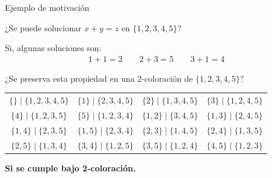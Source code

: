 \begin{frame}{Ejemplo de motivación}
    \begin{center}
        ¿Se puede solucionar $x+y=z$ en $\{1,2,3,4,5\}$?
        \pause\vspace{4pt}

        Si, algunas soluciones son:
        \begin{align*}
        1+1 = 2 \qquad
        2+3 = 5 \qquad
        3+1 = 4
        \end{align*}

        \pause\vspace{4pt}

        ¿Se preserva esta propiedad en una 2-coloración de $\{1,2,3,4,5\}$?

        \begin{table}[H]
        \centering
        \begin{tabular}{cccc}
        $\{\}\mid\{1,2,3,4,5\}$ &
        $\{1\}\mid\{2,3,4,5\}$ &
        $\{2\}\mid\{1,3,4,5\}$ &
        $\{3\}\mid\{1,2,4,5\}$ \\

        $\{4\}\mid\{1,2,3,5\}$ &
        $\{5\}\mid\{1,2,3,4\}$ &
        $\{1,2\}\mid\{3,4,5\}$ &
        $\{1,3\}\mid\{2,4,5\}$ \\

        $\{1,4\}\mid\{2,3,5\}$ &
        $\{1,5\}\mid\{2,3,4\}$ &
        $\{2,3\}\mid\{1,4,5\}$ &
        $\{2,4\}\mid\{1,3,5\}$ \\

        $\{2,5\}\mid\{1,3,4\}$ &
        $\{3,4\}\mid\{1,2,5\}$ &
        $\{3,5\}\mid\{1,2,4\}$ &
        $\{4,5\}\mid\{1,2,3\}$ \\
        \end{tabular}
        \end{table}

        \pause

        \textbf{Si se cumple bajo 2-coloración.}
    \end{center}
\end{frame}


